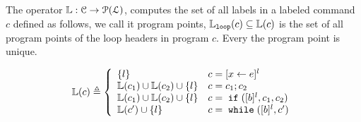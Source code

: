 The operator $\mathbb{L}: \mathcal{C} \to \mathcal{P}(\mathcal{L})$,
computes the set of all labels
in a labeled command $c$ defined as follows, we call it program points, 
$\mathbb{L}_{\mathtt{loop}}(c) \subseteq \mathbb{L}(c)$ is the set of all program points of the loop headers in program $c$.
Every the program point is unique.
\begin{defn}
\label{def:lvar}
{\small
$$
  \lvar(c) \triangleq
  \left\{
  \begin{array}{ll}
      \{l\}                  
      & {c} = [{\assign x e}]^{l} 
      \\
      \lvar({c_1}) \cup \lvar({{c_2}})  \cup \{l\} 
      & {c} = {c_1};{c_2}
      \\
      \lvar(c_1) \cup \lvar({{c_2}}) \cup \{l\} 
      & {c} =\eif([\bexpr]^{l}, c_1, c_2) 
      \\
      \lvar({{c}'}) \cup \{l\} 
      & {c}   = \ewhile ([\bexpr]^{l}, {c}')
\end{array}
\right.
$$
}
\end{defn}

